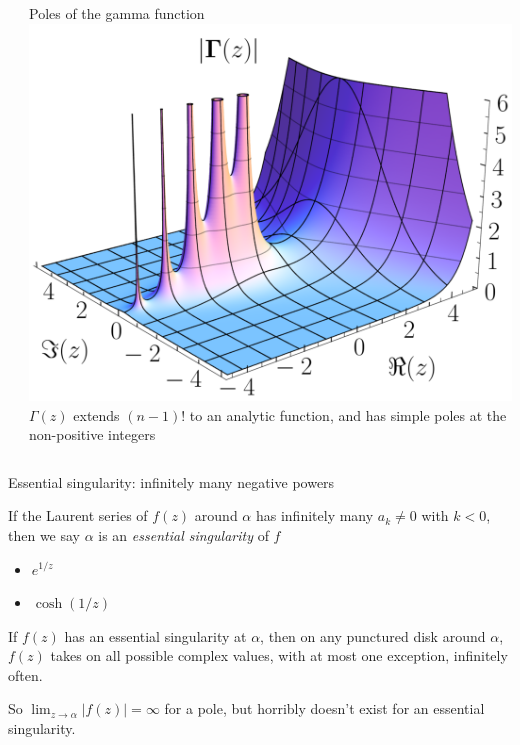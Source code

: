 \documentclass{beamer}
\begin{document}
\begin{frame}[plain]
\begin{columns}
\begin{column}{0.5\textwidth}
\end{column}
\begin{column}{0.5\textwidth}
\begin{block}{Poles of the gamma function}
\includegraphics[width=\textwidth,keepaspectratio]{GammaPoles.png}
$\Gamma(z)$ extends $(n-1)!$ to an analytic function, and has simple poles at the non-positive integers
\end{block}
\end{column}
\end{columns}

\end{frame}
\begin{frame}{Essential singularity: infinitely many negative powers}
\begin{definition} If the Laurent series of $f(z)$ around $\alpha$ has infinitely many $a_{k}\neq 0$ with $k<0$, then we say $\alpha$ is an \emph{essential singularity} of $f$\end{definition}


\begin{examples}
\begin{itemize}
    \item $e^{1/z}$
    \item $\cosh(1/z)$
\end{itemize}
\end{examples}

\begin{theorem}
If $f(z)$ has an essential singularity at $\alpha$, then on any punctured disk around $\alpha$, $f(z)$ takes on all possible complex values, with at most one exception, infinitely often.
\end{theorem}
So $\lim_{z\to\alpha} |f(z)|=\infty$ for a pole, but horribly doesn't exist for an essential singularity.

\end{frame}
\end{document}
